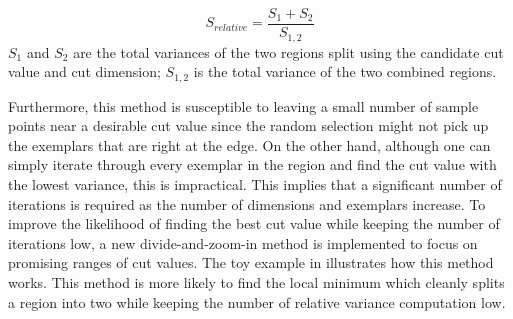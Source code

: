 \begin{equation}
S_{relative} = \frac{S_1+S_2}{S_{1,2}}
\end{equation}
$S_1$ and $S_2$ are the total variances of the two regions split using the candidate cut value and cut dimension; $S_{1,2}$ is the total variance of the two combined regions.

Furthermore, this method is susceptible to leaving a small number of sample points near a desirable cut value since the random selection might not pick up the exemplars that are right at the edge. On the other hand, although one can simply iterate through every exemplar in the region and find the cut value with the lowest variance, this is impractical. This implies that a significant number of iterations is required as the number of dimensions and exemplars increase. To improve the likelihood of finding the best cut value while keeping the number of iterations low, a new divide-and-zoom-in method is implemented to focus on promising ranges of cut values. The toy example in   illustrates how this method works. This method is more likely to find the local minimum which cleanly splits a region into two while keeping the number of relative variance computation low. 

